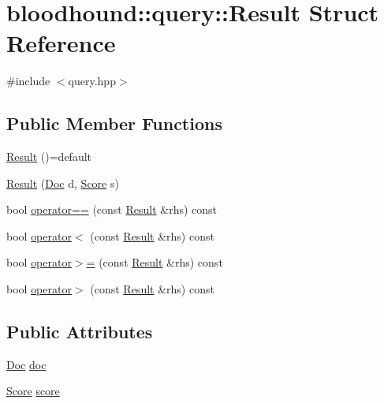 \hypertarget{structbloodhound_1_1query_1_1Result}{}\section{bloodhound\+:\+:query\+:\+:Result Struct Reference}
\label{structbloodhound_1_1query_1_1Result}


{\ttfamily \#include $<$query.\+hpp$>$}

\subsection*{Public Member Functions}
\begin{DoxyCompactItemize}
\item 
\mbox{\hyperlink{structbloodhound_1_1query_1_1Result_a6a9aaa804dbe3929b653b614e18408e1}{Result}} ()=default
\item 
\mbox{\hyperlink{structbloodhound_1_1query_1_1Result_ac4c15cb4d9e60b3e7bf37bd813215f55}{Result}} (\mbox{\hyperlink{structbloodhound_1_1Doc}{Doc}} d, \mbox{\hyperlink{structbloodhound_1_1Score}{Score}} s)
\item 
bool \mbox{\hyperlink{structbloodhound_1_1query_1_1Result_af7fa537e271f9f8b213e207331d5e647}{operator==}} (const \mbox{\hyperlink{structbloodhound_1_1query_1_1Result}{Result}} \&rhs) const
\item 
bool \mbox{\hyperlink{structbloodhound_1_1query_1_1Result_aafd7ab327a6ae26df25272b1ad1ec4c0}{operator$<$}} (const \mbox{\hyperlink{structbloodhound_1_1query_1_1Result}{Result}} \&rhs) const
\item 
bool \mbox{\hyperlink{structbloodhound_1_1query_1_1Result_a5af24f990ab7687d25e25b1f66dfb8a3}{operator$>$=}} (const \mbox{\hyperlink{structbloodhound_1_1query_1_1Result}{Result}} \&rhs) const
\item 
bool \mbox{\hyperlink{structbloodhound_1_1query_1_1Result_af04b71da89ecfa88ee4836dd82fdc058}{operator$>$}} (const \mbox{\hyperlink{structbloodhound_1_1query_1_1Result}{Result}} \&rhs) const
\end{DoxyCompactItemize}
\subsection*{Public Attributes}
\begin{DoxyCompactItemize}
\item 
\mbox{\hyperlink{structbloodhound_1_1Doc}{Doc}} \mbox{\hyperlink{structbloodhound_1_1query_1_1Result_a5f6acbb120aaf435333e410c0595962a}{doc}}
\item 
\mbox{\hyperlink{structbloodhound_1_1Score}{Score}} \mbox{\hyperlink{structbloodhound_1_1query_1_1Result_af9f240e486460b5130eff110b0f3c7a3}{score}}
\end{DoxyCompactItemize}


